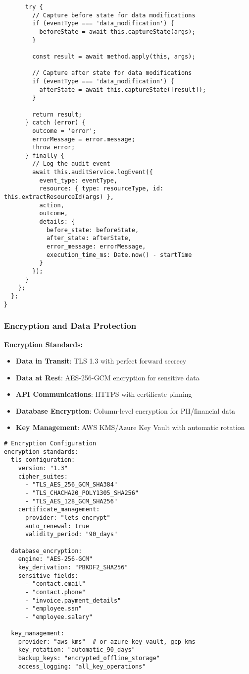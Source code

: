 \begin{verbatim}
      try {
        // Capture before state for data modifications
        if (eventType === 'data_modification') {
          beforeState = await this.captureState(args);
        }
        
        const result = await method.apply(this, args);
        
        // Capture after state for data modifications
        if (eventType === 'data_modification') {
          afterState = await this.captureState([result]);
        }
        
        return result;
      } catch (error) {
        outcome = 'error';
        errorMessage = error.message;
        throw error;
      } finally {
        // Log the audit event
        await this.auditService.logEvent({
          event_type: eventType,
          resource: { type: resourceType, id: this.extractResourceId(args) },
          action,
          outcome,
          details: {
            before_state: beforeState,
            after_state: afterState,
            error_message: errorMessage,
            execution_time_ms: Date.now() - startTime
          }
        });
      }
    };
  };
}
\end{verbatim}

\subsubsection{Encryption and Data Protection}

\textbf{Encryption Standards:}

\begin{itemize}
  \item \textbf{Data in Transit}: TLS 1.3 with perfect forward secrecy
  \item \textbf{Data at Rest}: AES-256-GCM encryption for sensitive data
  \item \textbf{API Communications}: HTTPS with certificate pinning
  \item \textbf{Database Encryption}: Column-level encryption for PII/financial data
  \item \textbf{Key Management}: AWS KMS/Azure Key Vault with automatic rotation
\end{itemize}

\begin{verbatim}
# Encryption Configuration
encryption_standards:
  tls_configuration:
    version: "1.3"
    cipher_suites:
      - "TLS_AES_256_GCM_SHA384"
      - "TLS_CHACHA20_POLY1305_SHA256"
      - "TLS_AES_128_GCM_SHA256"
    certificate_management:
      provider: "lets_encrypt"
      auto_renewal: true
      validity_period: "90_days"
      
  database_encryption:
    engine: "AES-256-GCM"
    key_derivation: "PBKDF2_SHA256"
    sensitive_fields:
      - "contact.email"
      - "contact.phone" 
      - "invoice.payment_details"
      - "employee.ssn"
      - "employee.salary"
      
  key_management:
    provider: "aws_kms"  # or azure_key_vault, gcp_kms
    key_rotation: "automatic_90_days"
    backup_keys: "encrypted_offline_storage"
    access_logging: "all_key_operations"
\end{verbatim}

